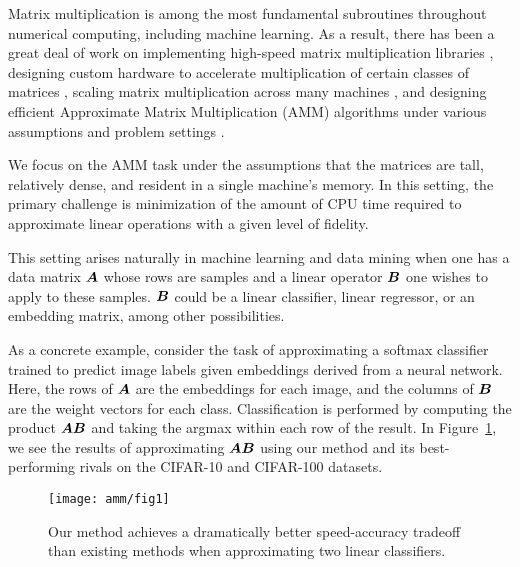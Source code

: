 
Matrix multiplication is among the most fundamental subroutines throughout numerical computing, including machine learning. As a result, there has been a great deal of work on implementing high-speed matrix multiplication libraries \cite{pytorch,eigen,tensorflow}, designing custom hardware to accelerate multiplication of certain classes of matrices \cite{eie,eyeriss,scnn,tpu}, scaling matrix multiplication across many machines \cite{distributedCoded, shortDot, entangledPolynomial, matmulCommunicationBounds}, and designing efficient Approximate Matrix Multiplication (AMM) algorithms under various assumptions and problem settings \cite{drineas_fast_2006,manne_fast_2014,ye_frequent_2016,mroueh_co-occuring_2016,bolt}.

We focus on the AMM task under the assumptions that the matrices are tall, relatively dense, and resident in a single machine's memory. In this setting, the primary challenge is minimization of the amount of CPU time required to approximate linear operations with a given level of fidelity.

This setting arises naturally in machine learning and data mining when one has a data matrix $\bm{A}$ whose rows are samples and a linear operator $\bm{B}$ one wishes to apply to these samples. $\bm{B}$ could be a linear classifier, linear regressor, or an embedding matrix, among other possibilities.

As a concrete example, consider the task of approximating a softmax classifier trained to predict image labels given embeddings derived from a neural network. Here, the rows of $\bm{A}$ are the embeddings for each image, and the columns of $\bm{B}$ are the weight vectors for each class. Classification is performed by computing the product $\bm{A}\bm{B}$ and taking the argmax within each row of the result.
In Figure~\ref{fig:fig1}, we see the results of approximating $\bm{A}\bm{B}$ using our method and its best-performing rivals \cite{hashjl, sparsePCA} on the CIFAR-10 and CIFAR-100 datasets.
\vspace{1mm}
\begin{figure}[h]
\begin{center}
\texttt{[image: amm/fig1]}
\caption{Our method achieves a dramatically better speed-accuracy tradeoff than existing methods when approximating two linear classifiers.}
\label{fig:fig1}
\end{center}
\end{figure}

